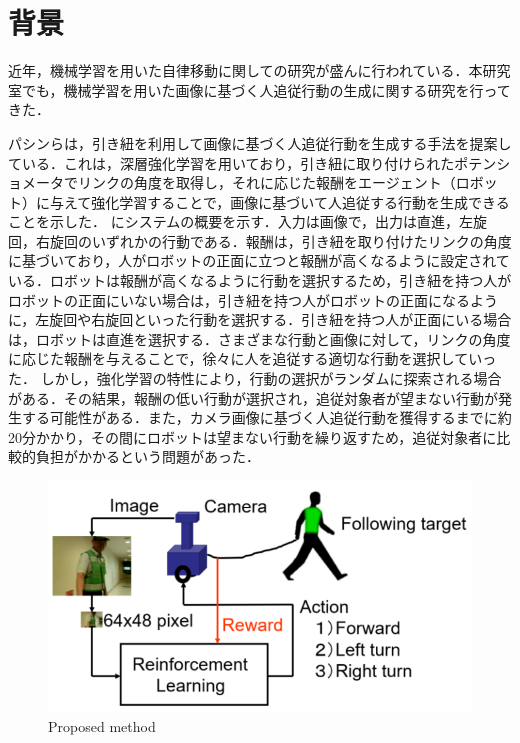 
\section{背景}
  近年，機械学習を用いた自律移動に関しての研究が盛んに行われている．本研究室でも，機械学習を用いた画像に基づく人追従行動の生成に関する研究を行ってきた．

  パシンら\cite{pasin1}\cite{pasin2}\cite{pasin3}は，引き紐を利用して画像に基づく人追従行動を生成する手法を提案している．これは，深層強化学習\cite{hado}を用いており，引き紐に取り付けられたポテンショメータでリンクの角度を取得し，それに応じた報酬をエージェント（ロボット）に与えて強化学習\cite{leslie}することで，画像に基づいて人追従する行動を生成できることを示した．
  にシステムの概要を示す．入力は画像で，出力は直進，左旋回，右旋回のいずれかの行動である．報酬は，引き紐を取り付けたリンクの角度に基づいており，人がロボットの正面に立つと報酬が高くなるように設定されている．ロボットは報酬が高くなるように行動を選択するため，引き紐を持つ人がロボットの正面にいない場合は，引き紐を持つ人がロボットの正面になるように，左旋回や右旋回といった行動を選択する．引き紐を持つ人が正面にいる場合は，ロボットは直進を選択する．さまざまな行動と画像に対して，リンクの角度に応じた報酬を与えることで，徐々に人を追従する適切な行動を選択していった．
  しかし，強化学習の特性により，行動の選択がランダムに探索される場合がある．その結果，報酬の低い行動が選択され，追従対象者が望まない行動が発生する可能性がある．また，カメラ画像に基づく人追従行動を獲得するまでに約20分かかり，その間にロボットは望まない行動を繰り返すため，追従対象者に比較的負担がかかるという問題があった．

\newpage

  \begin{figure}[h]
    \centering
    \includegraphics[keepaspectratio, scale=0.45] {images/pasin_system.png}
    \caption{Proposed method \cite{pasin1}}
    \label{Fig:pasin_system}
  \end{figure}

